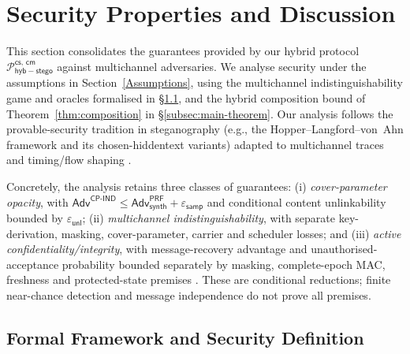 \documentclass[pdflatex,sn-mathphys-num]{sn-jnl}%
\theoremstyle{definition}
\theoremstyle{game}
\theoremstyle{thmstyleone}%
\theoremstyle{thmstyletwo}%
\theoremstyle{thmstylethree}%
\begin{document}
\section{Security Properties and Discussion}
\label{sec:security}

This section consolidates the guarantees provided by our hybrid protocol $\mathcal{P}^{\mathsf{cs,\,cm}}_{\mathsf{hyb-stego}}$ against multichannel adversaries. We analyse security under the assumptions in Section~\ref{Assumptions}, using the multichannel indistinguishability game and oracles formalised in \S\ref{subsec:formal}, and the hybrid composition bound of Theorem~\ref{thm:composition} in \S\ref{subsec:main-theorem}. Our analysis follows the provable-security tradition in steganography (e.g., the Hopper–Langford–von~Ahn framework and its chosen-hiddentext variants) adapted to multichannel traces and timing/flow shaping \cite{@hopper2009provably,@Hopper2002,vonahn2003publickey}. 

Concretely, the analysis retains three classes of guarantees:
(i) \emph{cover-parameter opacity}, with
$\mathsf{Adv}^{\mathsf{CP\text{-}IND}}\le
\mathsf{Adv}^{\mathsf{PRF}}_{\mathsf{synth}}+\varepsilon_{\mathsf{samp}}$
and conditional content unlinkability bounded by $\varepsilon_{\mathsf{unl}}$;
(ii) \emph{multichannel indistinguishability}, with separate key-derivation,
masking, cover-parameter, carrier and scheduler losses; and
(iii) \emph{active confidentiality/integrity}, with message-recovery advantage
and unauthorised-acceptance probability bounded separately by masking,
complete-epoch MAC, freshness and protected-state premises
\cite{rfc2104,bellare1996keying}. These are conditional reductions; finite
near-chance detection and message independence do not prove all premises.

\subsection{Formal Framework and Security Definition}\label{subsec:formal}
\end{document}
